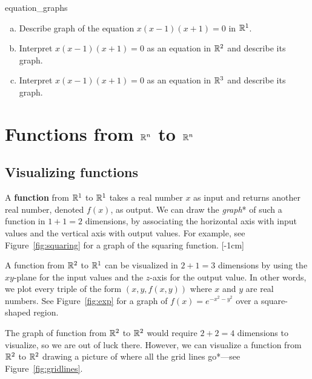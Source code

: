 \documentclass{watsonbook}
\begin{document}
\begin{exercise}{}{equation_graphs}
  \begin{enumerate}[(a), leftmargin = 12pt, itemsep = 4pt]
  \item Describe graph of the equation $x(x-1)(x+1) = 0$ in
  $\mathbb{R}^1$. 
  \item Interpret $x(x-1)(x+1) = 0$ as an equation in $\mathbb{R}^2$ and
  describe its graph. 
  \item Interpret $x(x-1)(x+1) = 0$ as an equation in $\mathbb{R}^3$ and
    describe its graph.
  \end{enumerate}
\end{exercise}

\section{Functions from $\mathbb{R}^n$ to $\mathbb{R}^n$} \label{sec:RntoRn}

\subsection{Visualizing functions}

A \textbf{function} from $\mathbb{R}^1$ to $\mathbb{R}^1$ takes a real number $x$ as
input and returns another real number, denoted $f(x)$, as output. We
can draw the \textit{graph}* of such a function in $1 + 1 = 2$
dimensions, by associating the horizontal axis with input values and
the vertical axis with output values. For example, see
Figure~\ref{fig:squaring} for a graph of the squaring
function. [-1cm]

A function from $\mathbb{R}^2$ to $\mathbb{R}^1$ can be visualized in $2 + 1 = 3$
dimensions by using the $xy$-plane for the input values and the
$z$-axis for the output value. In other words, we plot every triple of
the form $(x,y,f(x,y))$ where $x$ and $y$ are real numbers. See
Figure~\ref{fig:exp} for a graph of $f(x) = e^{-x^2 - y^2}$ over a
square-shaped region.

The graph of function from $\mathbb{R}^2$ to $\mathbb{R}^2$ would require $2 + 2 = 4$
dimensions to visualize, so we are out of luck there. However, we can
visualize a function from $\mathbb{R}^2$ to $\mathbb{R}^2$ drawing a picture of where
all the grid lines go*---see
Figure~\ref{fig:gridlines}.
\end{document}
